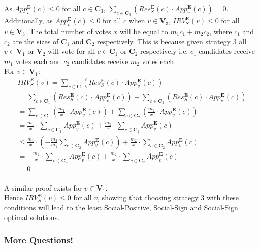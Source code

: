 \documentclass{article}
\begin{document}
As $App^{\pmb{E}}_{v}(c) \leq 0$ for all $c \in \pmb{C}_{3}$, $\sum^{}_{c \in \pmb{C}_{3}}{(Res^{\pmb{E}}_{S}(c) \cdot App^{\pmb{E}}_{v}(c))}=0$. 
Additionally, as $App^{\pmb{E}}_{v}(c) \leq 0$ for all $c$ when $v \in \pmb{V}_{3}$, ${IRV}^{\pmb{E}}_{S}(v) \leq 0$ for all $v \in \pmb{V}_{3}$. 
The total number of votes $x$ will be equal to ${m}_{1}{c}_{1}+{m}_{2}{c}_{2}$, where ${c}_{1}$ and ${c}_{2}$ are the sizes of $\pmb{C}_{1}$ and $\pmb{C}_{2}$ respectively. This is because given strategy 3 all $v \in \pmb{V}_{1}$ or $\pmb{V}_{2}$ will vote for all $c \in \pmb{C}_{1}$ or $\pmb{C}_{2}$ respectively i.e. ${c}_{1}$ candidates receive ${m}_{1}$ votes each and ${c}_{2}$ candidates receive ${m}_{2}$ votes each.\\
For $v \in \pmb{V}_{1}$:
\begin{equation}
\begin{split}
    {IRV}^{\pmb{E}}_{S}(v) = \sum^{}_{c \in \pmb{C}}{(Res^{\pmb{E}}_{S}(c) \cdot App^{\pmb{E}}_{v}(c))}\\
    = \sum^{}_{c \in \pmb{C}_{1}}{(Res^{\pmb{E}}_{S}(c) \cdot App^{\pmb{E}}_{v}(c))}+\sum^{}_{c \in \pmb{C}_{2}}{(Res^{\pmb{E}}_{S}(c) \cdot App^{\pmb{E}}_{v}(c))}\\
    = \sum^{}_{c \in \pmb{C}_{1}}{(\frac{{m}_{1}}{x} \cdot App^{\pmb{E}}_{v}(c))}+\sum^{}_{c \in \pmb{C}_{2}}{(\frac{{m}_{2}}{x} \cdot App^{\pmb{E}}_{v}(c))}\\
    = \frac{{m}_{1}}{x} \cdot \sum^{}_{c \in \pmb{C}_{1}}{App^{\pmb{E}}_{v}(c)}+\frac{{m}_{2}}{x} \cdot \sum^{}_{c \in \pmb{C}_{2}}{App^{\pmb{E}}_{v}(c)}\\
    \leq \frac{{m}_{1}}{x} \cdot (-\frac{{m}_{2}}{{m}_{1}}\sum^{}_{c \in \pmb{C}_{2}}{App^{\pmb{E}}_{v}(c)})+\frac{{m}_{2}}{x} \cdot \sum^{}_{c \in \pmb{C}_{2}}{App^{\pmb{E}}_{v}(c)}\\
    = -\frac{{m}_{2}}{x} \cdot \sum^{}_{c \in \pmb{C}_{2}}{App^{\pmb{E}}_{v}(c)}+\frac{{m}_{2}}{x} \cdot \sum^{}_{c \in \pmb{C}_{2}}{App^{\pmb{E}}_{v}(c)}\\
    = 0
\end{split}     
\end{equation}\\

A similar proof exists for $v \in \pmb{V}_{1}$.\\
Hence ${IRV}^{\pmb{E}}_{S}(v) \leq 0$ for all $v$, showing that choosing strategy 3 with these conditions will lead to the least Social-Positive, Social-Sign and Social-Sign optimal solutions. 

\subsubsection{More Questions!}
\end{document}
